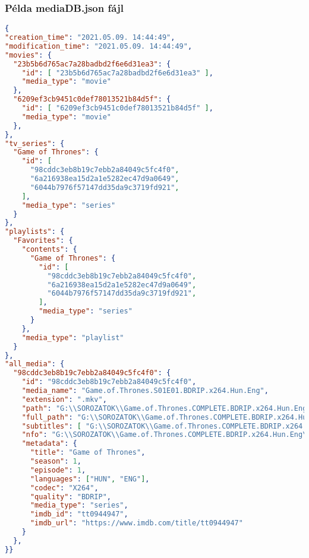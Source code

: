 \cleardoublepage
\subsubsection{Példa mediaDB.json fájl}

\begin{lstlisting}[language={json}]
{
"creation_time": "2021.05.09. 14:44:49",
"modification_time": "2021.05.09. 14:44:49",
"movies": {
  "23b5b6d765ac7a28badbd2f6e6d31ea3": {
    "id": [ "23b5b6d765ac7a28badbd2f6e6d31ea3" ],
    "media_type": "movie"
  },
  "6209ef3cb9451c0def78013521b84d5f": {
    "id": [ "6209ef3cb9451c0def78013521b84d5f" ],
    "media_type": "movie"
  },
},
"tv_series": {
  "Game of Thrones": {
    "id": [
      "98cddc3eb8b19c7ebb2a84049c5fc4f0",
      "6a216938ea15d2a1e5282ec47d9a0649",
      "6044b7976f57147dd35da9c3719fd921",
    ],
    "media_type": "series"
  }
},
"playlists": {
  "Favorites": {
    "contents": {
      "Game of Thrones": {
        "id": [
          "98cddc3eb8b19c7ebb2a84049c5fc4f0",
          "6a216938ea15d2a1e5282ec47d9a0649",
          "6044b7976f57147dd35da9c3719fd921",
        ],
        "media_type": "series"
      }
    },
    "media_type": "playlist"
  }
},
"all_media": {
  "98cddc3eb8b19c7ebb2a84049c5fc4f0": {
    "id": "98cddc3eb8b19c7ebb2a84049c5fc4f0",
    "media_name": "Game.of.Thrones.S01E01.BDRIP.x264.Hun.Eng",
    "extension": ".mkv",
    "path": "G:\\SOROZATOK\\Game.of.Thrones.COMPLETE.BDRIP.x264.Hun.Eng",
    "full_path": "G:\\SOROZATOK\\Game.of.Thrones.COMPLETE.BDRIP.x264.Hun.Eng\\Game.of.Thrones.S01E01.BDRIP.x264.Hun.Eng.mkv",
    "subtitles": [ "G:\\SOROZATOK\\Game.of.Thrones.COMPLETE.BDRIP.x264.Hun.Eng\\Game.of.Thrones.S01E01.BDRIP.x264.Hun.Eng.vtt" ],
    "nfo": "G:\\SOROZATOK\\Game.of.Thrones.COMPLETE.BDRIP.x264.Hun.Eng\\Game.of.Thrones.COMPLETE.BDRIP.x264.Hun.Eng.nfo",
    "metadata": {
      "title": "Game of Thrones",
      "season": 1,
      "episode": 1,
      "languages": ["HUN", "ENG"],
      "codec": "X264",
      "quality": "BDRIP",
      "media_type": "series",
      "imdb_id": "tt0944947",
      "imdb_url": "https://www.imdb.com/title/tt0944947"
    }
  },
}}
\end{lstlisting}

